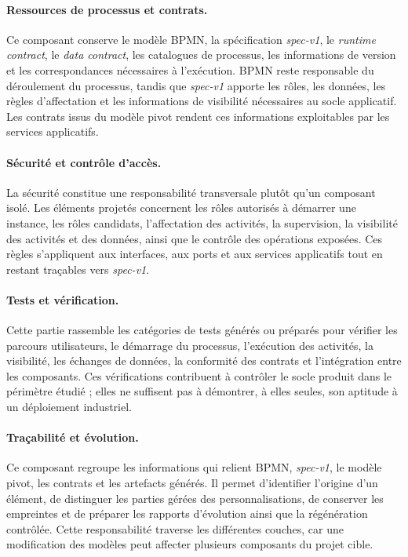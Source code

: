 \paragraph{Ressources de processus et contrats.}
Ce composant conserve le modèle BPMN, la spécification \textit{spec-v1}, le
\textit{runtime contract}, le \textit{data contract}, les catalogues de processus, les informations de
version et les correspondances nécessaires à l'exécution. BPMN reste responsable
du déroulement du processus, tandis que \textit{spec-v1} apporte les rôles, les
données, les règles d'affectation et les informations de visibilité nécessaires
au socle applicatif. Les contrats issus du modèle pivot rendent ces informations
exploitables par les services applicatifs.

\paragraph{Sécurité et contrôle d'accès.}
La sécurité constitue une responsabilité transversale plutôt qu'un composant
isolé. Les éléments projetés concernent les rôles autorisés à démarrer une
instance, les rôles candidats, l'affectation des activités, la supervision, la
visibilité des activités et des données, ainsi que le contrôle des opérations
exposées. Ces règles s'appliquent aux interfaces, aux ports et aux services
applicatifs tout en restant traçables vers \textit{spec-v1}.

\paragraph{Tests et vérification.}
Cette partie rassemble les catégories de tests générés ou préparés pour vérifier
les parcours utilisateurs, le démarrage du processus, l'exécution des activités,
la visibilité, les échanges de données, la conformité des contrats et
l'intégration entre les composants. Ces vérifications contribuent à contrôler le
socle produit dans le périmètre étudié ; elles ne suffisent pas à démontrer, à
elles seules, son aptitude à un déploiement industriel.

\paragraph{Traçabilité et évolution.}
Ce composant regroupe les informations qui relient BPMN, \textit{spec-v1}, le
modèle pivot, les contrats et les artefacts générés. Il permet d'identifier
l'origine d'un élément, de distinguer les parties gérées des personnalisations,
de conserver les empreintes et de préparer les rapports d'évolution ainsi que la
régénération contrôlée. Cette responsabilité traverse les différentes couches,
car une modification des modèles peut affecter plusieurs composants du projet
cible.

